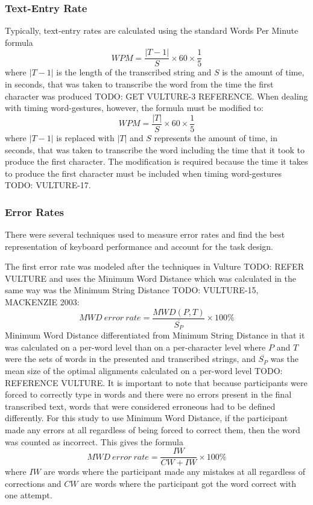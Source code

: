 \subsubsection{Text-Entry Rate}
Typically, text-entry rates are calculated using the standard Words Per Minute formula
\begin{equation}
WPM = \frac{|T-1|}{S} \times 60 \times \frac{1}{5}
\end{equation}
where $|T-1|$ is the length of the transcribed string and $S$ is the amount of time, in seconds, that was taken to transcribe the word from the time the first character was produced TODO: GET VULTURE-3 REFERENCE. When dealing with timing word-gestures, however, the formula must be modified to:
\begin{equation} \label{WPM}
WPM = \frac{|T|}{S} \times 60 \times \frac{1}{5}
\end{equation}
where $|T-1|$ is replaced with $|T|$ and $S$ represents the amount of time, in seconds, that was taken to transcribe the word including the time that it took to produce the first character. The modification is required because the time it takes to produce the first character must be included when timing word-gestures TODO: VULTURE-17.

\subsubsection{Error Rates}
There were several techniques used to measure error rates and find the best representation of keyboard performance and account for the task design.

The first error rate was modeled after the techniques in Vulture TODO: REFER VULTURE and uses the Minimum Word Distance which was calculated in the same way was the Minimum String Distance TODO: VULTURE-15, MACKENZIE 2003:
\begin{equation} \label{MWD}
MWD\ error\ rate = \frac{MWD(P,T)}{\overline{S_P}} \times 100\%
\end{equation}
Minimum Word Distance differentiated from Minimum String Distance in that it was calculated on a per-word level than on a per-character level where $P$ and $T$ were the sets of words in the presented and transcribed strings, and $\overline{S_P}$ was the mean size of the optimal alignments calculated on a per-word level TODO: REFERENCE VULTURE. It is important to note that because participants were forced to correctly type in words and there were no errors present in the final transcribed text, words that were considered erroneous had to be defined differently. For this study to use Minimum Word Distance, if the participant made any errors at all regardless of being forced to correct them, then the word was counted as incorrect. This gives the formula
\begin{equation} \label{MWD_simple}
MWD\ error\ rate = \frac{IW}{CW + IW} \times 100\%
\end{equation}
where $IW$ are words where the participant made any mistakes at all regardless of corrections and $CW$ are words where the participant got the word correct with one attempt.

